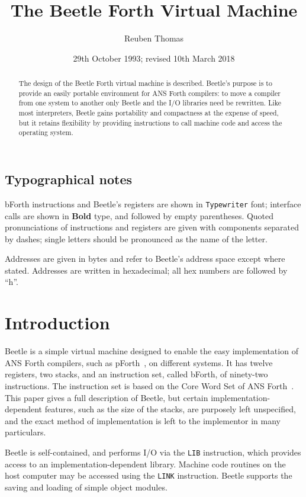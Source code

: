 \documentclass[english]{article}
\title{The Beetle Forth Virtual Machine}
\author{Reuben Thomas}
\date{29th October 1993; revised 10th March 2018}
\newlength{\pronunc}\pronunc=1.7in
\begin{document}
\maketitle

\begin{abstract}
\noindent The design of the Beetle Forth virtual machine is described.
Beetle's purpose is to provide an easily portable environment for ANS Forth
compilers: to move a compiler from one system to another only Beetle and the I/O
libraries need be rewritten. Like most interpreters, Beetle gains portability
and compactness at the expense of speed, but it retains flexibility by providing
instructions to call machine code and access the operating system.
\end{abstract}


\subsection*{Typographical notes}

bForth instructions and Beetle's registers are shown in {\tt Typewriter} font;
interface calls are shown in {\bf Bold} type, and followed by empty parentheses.
Quoted pronunciations of instructions and registers are given with components
separated by dashes; single letters should be pronounced as the name of the
letter.

Addresses are given in bytes and refer to Beetle's address space except where
stated. Addresses are written in hexadecimal; all hex numbers are followed by
``h''.


\section{Introduction}

Beetle is a simple virtual machine designed to enable the easy implementation
of ANS Forth compilers, such as pForth~\cite{beetledis}, on different systems.
It has twelve registers, two stacks, and an instruction set, called bForth, of
ninety-two instructions. The instruction set is based on the Core Word Set of
ANS Forth~\cite{ANSIforth}. This paper gives a full description of Beetle, but
certain implementation-dependent features, such as the size of the stacks, are
purposely left unspecified, and the exact method of implementation is left to
the implementor in many particulars.

Beetle is self-contained, and performs I/O via the {\tt LIB} instruction, which
provides access to an implementation-dependent library. Machine
code routines on the host computer may be accessed using the {\tt LINK}
instruction. Beetle supports the saving and loading of simple object modules.
\end{document}
